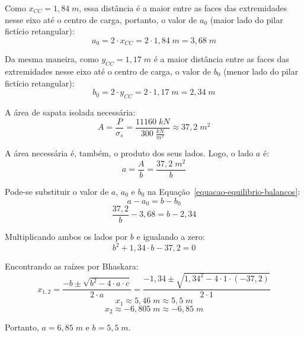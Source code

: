 Como $x_{CC}=1,84\;m$, essa distância é a maior entre as faces das extremidades nesse eixo até o centro de carga, portanto, o valor de $a_0$ (maior lado do pilar fictício retangular):
$$a_0=2\cdot x_{CC}=2\cdot1,84\;m=3,68\;m$$

Da mesma maneira, como $y_{CC}=1,17\;m$ é a maior distância entre as faces das extremidades nesse eixo até o centro de carga, o valor de $b_0$ (menor lado do pilar fictício retangular):
$$b_0=2\cdot y_{CC}=2\cdot1,17\;m=2,34\;m$$

A área de sapata isolada necessária:
$$A=\frac{P}{\sigma_s}=\frac{11160\;kN}{300\;\frac{kN}{m^2}}\approx37,2\;m^2$$

A área necessária é, também, o produto dos seus lados. Logo, o lado $a$ é:
$$a=\frac{A}{b}=\frac{37,2\;m^2}{b}$$

Pode-se substituir o valor de $a$, $a_0$ e $b_0$ na Equação~\eqref{equacao-equilibrio-balancos}:
$$a-a_0=b-b_0$$
$$\frac{37,2}{b}-3,68=b-2,34$$

Multiplicando ambos os lados por $b$ e igualando a zero:
$$b^2+1,34\cdot b-37,2=0$$

Encontrando as raízes por Bhaskara:
$$x_{1,2}=\frac{-b\pm\sqrt{b^2-4\cdot a \cdot c}}{2\cdot a}=\frac{-1,34\pm\sqrt{1,34^2-4\cdot 1 \cdot (-37,2)}}{2\cdot 1}$$
$$x_1\approx5,46\;m\approx5,5\;m$$
$$x_2\approx-6,805\;m\approx-6,85\;m$$

Portanto, $a=6,85\;m$ e $b=5,5\;m$.